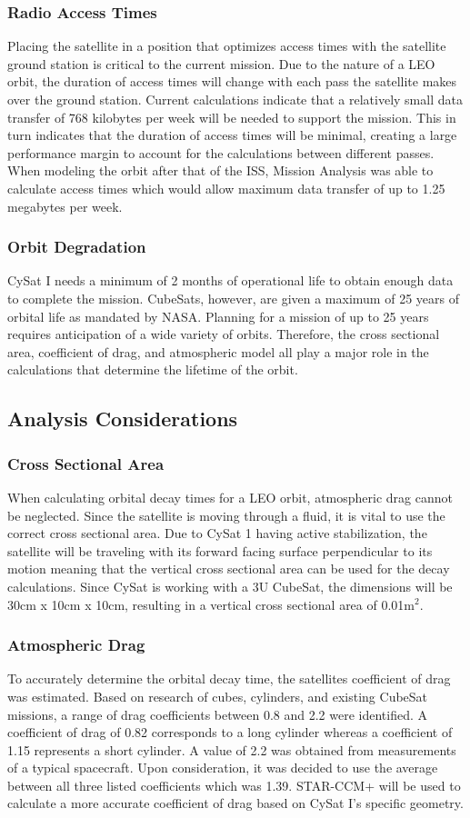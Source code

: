 \documentclass[nocover]            %
{CSLI}                       %
\begin{document}
\subsubsection{Radio Access Times}
Placing the satellite in a position that optimizes access times with the satellite ground station is critical to the current mission. Due to the nature of a LEO orbit, the duration of access times will change with each pass the satellite makes over the ground station. Current calculations indicate that a relatively small data transfer of 768 kilobytes per week will be needed to support the mission. This in turn indicates that the duration of access times will be minimal, creating a large performance margin to account for the calculations between different passes. When modeling the orbit after that of the ISS, Mission Analysis was able to calculate access times which would allow maximum data transfer of up to 1.25 megabytes per week.
\subsubsection{Orbit Degradation}
CySat I needs a minimum of 2 months of operational life to obtain enough data to complete the mission. CubeSats, however, are given a maximum of 25 years of orbital life as mandated by NASA. Planning for a mission of up to 25 years requires anticipation of a wide variety of orbits. Therefore, the cross sectional area, coefficient of drag, and atmospheric model all play a major role in the calculations that determine the lifetime of the orbit.
\subsection{Analysis Considerations}
\subsubsection{Cross Sectional Area}
When calculating orbital decay times for a LEO orbit, atmospheric drag cannot be neglected. Since the satellite is moving through a fluid, it is vital to use the correct cross sectional area. Due to CySat 1 having active stabilization, the satellite will be traveling with its forward facing surface perpendicular to its motion meaning that the vertical cross sectional area can be used for the decay calculations. Since CySat is working with a 3U CubeSat, the dimensions will be 30cm x 10cm x 10cm, resulting in a vertical cross sectional area of 0.01m$^2$.
\subsubsection{Atmospheric Drag}
To accurately determine the orbital decay time, the satellites coefficient of drag was estimated. Based on research of cubes, cylinders, and existing CubeSat missions, a range of drag coefficients between 0.8 and 2.2 were identified. A coefficient of drag of 0.82 corresponds to a long cylinder whereas a coefficient of 1.15 represents a short cylinder. A value of 2.2 was obtained from measurements of a typical spacecraft. Upon consideration, it was decided to use the average between all three listed coefficients which was 1.39. STAR-CCM+ will be used to calculate a more accurate coefficient of drag based on CySat I's specific geometry.
\end{document}
